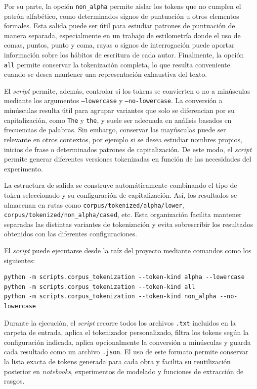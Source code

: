 \documentclass[IB]{TFUOC}%
\begin{document}
Por su parte, la opción \texttt{non\_alpha} permite aislar los tokens que no cumplen el patrón alfabético, como determinados signos de puntuación u otros elementos formales. Esta salida puede ser útil para estudiar patrones de puntuación de manera separada, especialmente en un trabajo de estilometría donde el uso de comas, puntos, punto y coma, rayas o signos de interrogación puede aportar información sobre los hábitos de escritura de cada autor. Finalmente, la opción \texttt{all} permite conservar la tokenización completa, lo que resulta conveniente cuando se desea mantener una representación exhaustiva del texto.

El \textit{script} permite, además, controlar si los tokens se convierten o no a minúsculas mediante los argumentos \texttt{--lowercase} y \texttt{--no-lowercase}. La conversión a minúsculas resulta útil para agrupar variantes que solo se diferencian por su capitalización, como \texttt{The} y \texttt{the}, y suele ser adecuada en análisis basados en frecuencias de palabras. Sin embargo, conservar las mayúsculas puede ser relevante en otros contextos, por ejemplo si se desea estudiar nombres propios, inicios de frase o determinados patrones de capitalización. De este modo, el \textit{script} permite generar diferentes versiones tokenizadas en función de las necesidades del experimento.

La estructura de salida se construye automáticamente combinando el tipo de token seleccionado y su configuración de capitalización. Así, los resultados se almacenan en rutas como \texttt{corpus/tokenized/alpha/lower}, \texttt{corpus/tokenized/non\_alpha/cased}, etc. Esta organización facilita mantener separadas las distintas variantes de tokenización y evita sobrescribir los resultados obtenidos con las diferentes configuraciones.

El \textit{script} puede ejecutarse desde la raíz del proyecto mediante comandos como los siguientes:

\begin{verbatim}
python -m scripts.corpus_tokenization --token-kind alpha --lowercase
python -m scripts.corpus_tokenization --token-kind all
python -m scripts.corpus_tokenization --token-kind non_alpha --no-lowercase
\end{verbatim}

Durante la ejecución, el \textit{script} recorre todos los archivos \texttt{.txt} incluidos en la carpeta de entrada, aplica el tokenizador personalizado, filtra los tokens según la configuración indicada, aplica opcionalmente la conversión a minúsculas y guarda cada resultado como un archivo \texttt{.json}. El uso de este formato permite conservar la lista exacta de tokens generada para cada obra y facilita su reutilización posterior en \textit{notebooks}, experimentos de modelado y funciones de extracción de rasgos.
\end{document}
